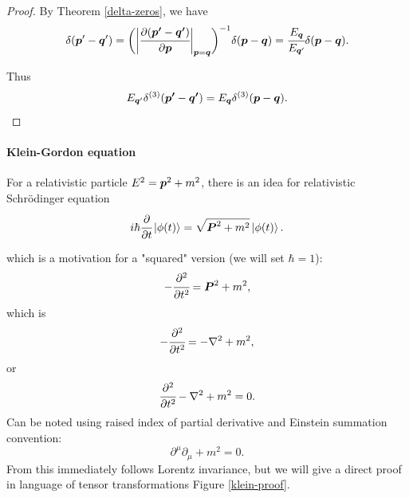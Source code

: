\documentclass[main.tex]{subfiles}
\begin{document}
\begin{proof}
By Theorem \ref{delta-zeros}, we have
\begin{equation}
 \delta(\boldsymbol{p}' - \boldsymbol{q}') = \bigg(\bigg|\cfrac{\partial(\boldsymbol{p'} - \boldsymbol{q'})}{\partial \boldsymbol{p}} \bigg|_{\boldsymbol{p}=\boldsymbol{q}}\bigg)^{-1} \delta(\boldsymbol{p} - \boldsymbol{q}) =
\cfrac{E_{\boldsymbol{q}}}{E_{\boldsymbol{q}'}} \delta(\boldsymbol{p} - \boldsymbol{q}).
\end{equation}




Thus
\begin{equation}
E_{\boldsymbol{q}'} \delta^{(3)}(\boldsymbol{p'} - \boldsymbol{q'}) = E_{\boldsymbol{q}}\delta^{(3)}(\boldsymbol{p} - \boldsymbol{q}).
\end{equation}
\end{proof}

\paragraph{Klein-Gordon equation}

For a relativistic particle $E^2 = \boldsymbol{p}^2 + m^2$, there is an idea for relativistic  Schrödinger equation
\begin{equation}
i\hbar \cfrac{\partial}{\partial t}\ket{\phi(t)} =  \sqrt{\boldsymbol{P}^2 + m^2} \ket{\phi(t)}.
\end{equation}

which is a motivation for a "squared" version (we will set $\hbar=1$):
\begin{equation}
-\cfrac{\partial^2}{\partial t^2} = \boldsymbol{P}^2 + m^2,
\end{equation}
which is
\begin{equation}
-\cfrac{\partial^2}{\partial t^2} = -\nabla^2 + m^2,
\end{equation}
or
\begin{equation}
\cfrac{\partial^2}{\partial t^2} - \nabla^2 + m^2 = 0.
\end{equation} 
Can be noted using raised index of partial derivative and Einstein summation convention:
\begin{equation}
\partial^\mu\partial_\mu + m^2 = 0.
\end{equation}
From this immediately follows Lorentz invariance, but we will give a direct proof in language of tensor transformations Figure \ref{klein-proof}.
\end{document}
